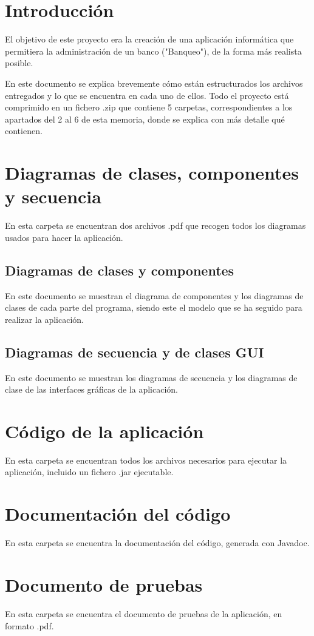 \documentclass[12pt]{article}
\begin{document}
\section{Introducción}
El objetivo de este proyecto era la creación de una aplicación informática que permitiera la administración de un banco ("Banqueo"), de la forma más realista posible.

En este documento se explica brevemente cómo están estructurados los archivos entregados y lo que se encuentra en cada uno de ellos. Todo el proyecto está comprimido en un fichero .zip que contiene 5 carpetas, correspondientes a los apartados del 2 al 6 de esta memoria, donde se explica con más detalle qué contienen.


\section{Diagramas de clases, componentes y secuencia}
En esta carpeta se encuentran dos archivos .pdf que recogen todos los diagramas usados para hacer la aplicación.
\subsection{Diagramas de clases y componentes}
En este documento se muestran el diagrama de componentes y los diagramas de clases de cada parte del programa, siendo este el modelo que se ha seguido para realizar la aplicación.
\subsection{Diagramas de secuencia y de clases GUI}
En este documento se muestran los diagramas de secuencia y los diagramas de clase de las interfaces gráficas de la aplicación.


\section{Código de la aplicación}
En esta carpeta se encuentran todos los archivos necesarios para ejecutar la aplicación, incluido un fichero .jar ejecutable.


\section{Documentación del código}
En esta carpeta se encuentra la documentación del código, generada con Javadoc.


\section{Documento de pruebas}
En esta carpeta se encuentra el documento de pruebas de la aplicación, en formato .pdf.
\end{document}

